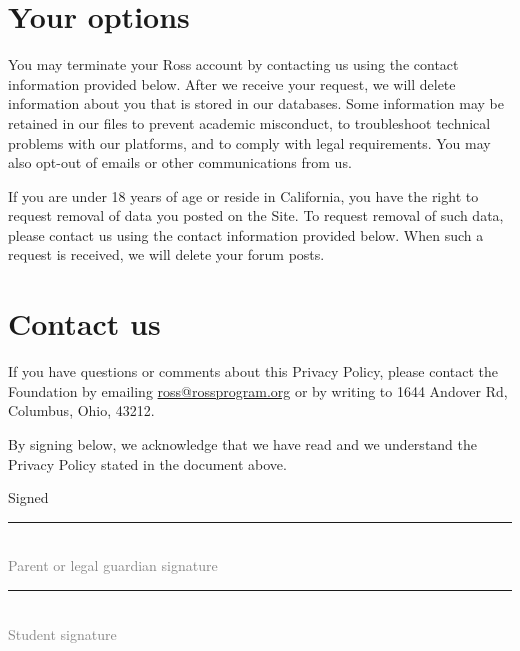 \documentclass{ross}
\begin{document}
\section{Your options}

You may terminate your Ross account by contacting us using the contact
information provided below.  After we receive your request, we will
delete information about you that is stored in our databases.  Some
information may be retained in our files to prevent academic
misconduct, to troubleshoot technical problems with our platforms, and
to comply with legal requirements.  You may also opt-out of emails or
other communications from us.

If you are under 18 years of age or reside in California, you have the
right to request removal of data you posted on the Site. To request
removal of such data, please contact us using the contact information
provided below. When such a request is received, we will delete your forum posts.

\section{Contact us}

If you have questions or comments about this Privacy Policy, please
contact the Foundation by emailing \url{ross@rossprogram.org} or by
writing to 1644 Andover Rd, Columbus, Ohio, 43212.

By signing below, we acknowledge that we have read and we understand
 the Privacy Policy stated in the document above.

\vspace{0.5in}
\hfill Signed \rule{3in}{0.1mm}\\[-1.5mm]
\hspace*{3.7in} {\footnotesize \textcolor{gray}{Parent or legal guardian signature} }


\vspace{0.5in}

\hfill  \rule{3in}{0.1mm}\\[-1.5mm]
\hspace*{3.7in} {\footnotesize \textcolor{gray}{Student signature} }


\end{document}

